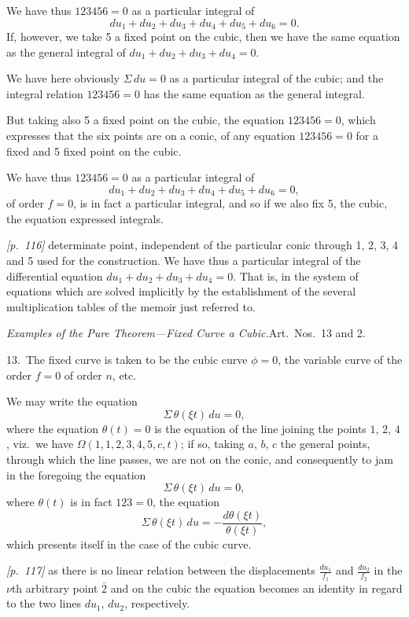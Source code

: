 \documentclass[11pt,a4paper]{book}
\begin{document}
We have thus $123456 = 0$ as a particular integral of
\[
du_1 + du_2 + du_3 + du_4 + du_5 + du_6 = 0.
\]
If, however, we take 5 a fixed point on the cubic, then we have the same equation as the general integral of $du_1 + du_2 + du_3 + du_4 = 0$.

We have here obviously $\Sigma\,du = 0$ as a particular integral of the cubic; and the integral relation $123456 = 0$ has the same equation as the general integral.

But taking also 5 a fixed point on the cubic, the equation $123456 = 0$, which expresses that the six points are on a conic, of any equation $123456 = 0$ for a fixed and 5 fixed point on the cubic.

We have thus $123456 = 0$ as a particular integral of
\[
du_1 + du_2 + du_3 + du_4 + du_5 + du_6 = 0,
\]
of order $f = 0$, is in fact a particular integral, and so if we also fix 5, the cubic, the equation expressed integrals.

\bigskip\noindent\textit{[p.~116]} determinate point, independent of the particular conic through 1, 2, 3, 4 and 5 used for the construction. We have thus a particular integral of the differential equation $du_1 + du_2 + du_3 + du_4 = 0$. That is, in the system of equations which are solved implicitly by the establishment of the several multiplication tables of the memoir just referred to.

\textit{Examples of the Pure Theorem---Fixed Curve a Cubic.}\quad Art.\ Nos.\ 13 and 2.

13.\ The fixed curve is taken to be the cubic curve $\phi = 0$, the variable curve of the order $f = 0$ of order $n$, etc.

We may write the equation
\[
\Sigma\,\theta(\xi t)\,du = 0,
\]
where the equation $\theta(t) = 0$ is the equation of the line joining the points $1$, $2$, $4$, viz.\ we have $\Omega(1, 1, 2, 3, 4, 5, c, t)$; if so, taking $a$, $b$, $c$ the general points, through which the line passes, we are not on the conic, and consequently to jam in the foregoing the equation
\[
\Sigma\,\theta(\xi t)\,du = 0,
\]
where $\theta(t)$ is in fact $123 = 0$, the equation
\[
\Sigma\,\theta(\xi t)\,du = -\frac{d\theta(\xi t)}{\theta(\xi t)},
\]
which presents itself in the case of the cubic curve.

\bigskip\noindent\textit{[p.~117]} as there is no linear relation between the displacements $\frac{du_1}{f_1}$ and $\frac{du_2}{f_2}$ in the $\nu$th arbitrary point $\bar{2}$ and on the cubic the equation becomes an identity in regard to the two lines $du_1$, $du_2$, respectively.
\end{document}
